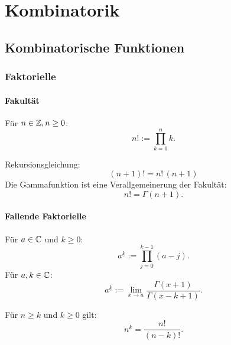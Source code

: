 
\chapter{Kombinatorik}
\section{Kombinatorische Funktionen}
\subsection{Faktorielle}
\subsubsection{Fakultät}
\begin{definition}[Fakultät]\mbox{}\newline
Für $n\in\mathbb Z, n\ge 0$:
\begin{equation}
n! := \prod_{k=1}^n k.
\end{equation}
\end{definition}
\noindent
Rekursionsgleichung:
\begin{equation}
(n+1)! = n!\,(n+1)
\end{equation}
Die Gammafunktion ist eine Verallgemeinerung der Fakultät:
\begin{equation}
n! = \Gamma(n+1).
\end{equation}

\subsubsection{Fallende Faktorielle}
\begin{definition}\mbox{}\newline
Für $a\in\mathbb C$ und $k\ge 0$:
\begin{equation}\label{eq:FF}
a^{\underline k} := \prod_{j=0}^{k-1} (a-j).
\end{equation}
Für $a,k\in\mathbb C$:
\begin{equation}
a^{\underline k} := \lim_{x\to a}\frac{\Gamma(x+1)}{\Gamma(x-k+1)}.
\end{equation}
\end{definition}
\noindent
Für $n\ge k$ und $k\ge 0$ gilt:
\begin{equation}
n^{\underline k} = \frac{n!}{(n-k)!}.
\end{equation}

